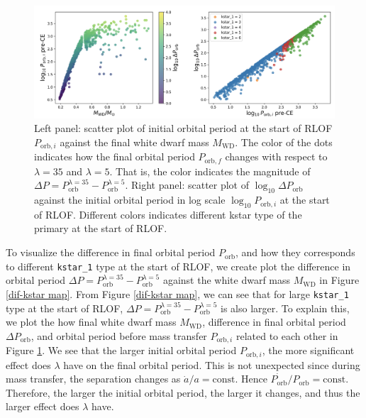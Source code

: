 \documentclass[12pt]{article}
\newcommand{\MWD}{M_{\mathrm{WD}}}
\newcommand{\Porb}{P_{\mathrm{orb}}}
\begin{document}
\begin{figure}
  \centering
  \includegraphics[width=\linewidth]{fig/dif-kstar two plot.png}
  \caption{Left panel: scatter plot of initial orbital period at the start of RLOF $P_{\mathrm{orb}, i}$ against the final white dwarf mass $\MWD$. The color of the dots indicates how the final orbital period $P_{\mathrm{orb}, f}$ changes with respect to $\lambda=35$ and $\lambda=5$. That is, the color indicates the magnitude of $\Delta P = P_{\mathrm{orb}}^{\lambda = 35} - P_{\mathrm{orb}}^{\lambda = 5}$. Right panel: scatter plot of $\log_{10} \Delta \Porb$ against the initial orbital period in log scale $\log_{10} P_{\mathrm{orb}, i}$ at the start of RLOF. Different colors indicates different kstar type of the primary at the start of RLOF.}
  \label{dif-kstar-exp}
\end{figure}

To visualize the difference in final orbital period $\Porb$, and how they corresponds to different \verb|kstar_1| type at the start of RLOF, we create plot the difference in orbital period $\Delta P = P_{\mathrm{orb}}^{\lambda = 35} - P_{\mathrm{orb}}^{\lambda = 5}$ against the white dwarf mass $\MWD$ in Figure \ref{dif-kstar map}. From Figure \ref{dif-kstar map}, we can see that for large \verb|kstar_1| type at the start of RLOF, $\Delta P = P_{\mathrm{orb}}^{\lambda = 35} - P_{\mathrm{orb}}^{\lambda = 5}$ is also larger. To explain this, we plot the how final white dwarf mass $\MWD$, difference in final orbital period $\Delta \Porb$, and orbital period before mass transfer $P_{\mathrm{orb}, i}$ related to each other in Figure \ref{dif-kstar-exp}. We see that the larger initial orbital period $P_{\mathrm{orb}, i}$, the more significant effect does $\lambda$ have on the final orbital period. This is not unexpected since during mass transfer, the separation changes as $\dot{a} / a = \text{const}$. Hence $\dot{\Porb} / \Porb = \text{const}$. Therefore, the larger the initial orbital period, the larger it changes, and thus the larger effect does $\lambda$ have.
\end{document}
